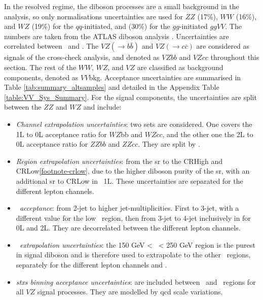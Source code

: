 In the resolved regime, the diboson processes are a small background in the analysis, so only normalisations uncertainties are used for $ZZ$ (17\%), $WW$ (16\%), and $WZ$ (19\%) for the $qq$-initiated, and (30\%) for the $gg$-initiated $ggVV$. The numbers are taken from the ATLAS diboson analysis \cite{ATL-PHYS-PUB-2023-007}. Uncertainties are correlated between \vhb\ and \vhc. The $VZ (\rightarrow b\bar{b})$ and $VZ (\rightarrow c\bar{c})$ are considered as signals of the cross-check analysis, and denoted as $VZbb$ and $VZcc$ throughout this section. The rest of the $WW$, $WZ$, and $VZ$ are classified as background components, denoted as $VV$bkg. Acceptance uncertainties are summarised in Table \ref{tab:summary_altsamples} and detailed in the Appendix Table \ref{table:VV_Sys_Summary}. For the signal components, the uncertainties are split between the $ZZ$ and $WZ$ and include:
\begin{itemize}[leftmargin=*]
    \item \textit{Channel extrapolation uncertainties}: two sets are considered. One covers the 1L to 0L acceptance ratio for $WZ$bb and $WZcc$, and the other one the 2L to 0L acceptance ratio for $ZZbb$ and $ZZcc$. They are split by \nj.
    \item \textit{Region extrapolation uncertainties}: from the \gls{sr} to the CRHigh and CRLow\cref{footnote-crlow}, due to the higher diboson purity of the \gls{sr}, with an additional \gls{sr} to CRLow in \vhb\ 1L. These uncertainties are separated for the different lepton channels.
    \item \textit{\nj\ acceptance}: from 2-jet to higher jet-multiplicities. First to 3-jet, with a different value for the low \ptv\ region, then from 3-jet to 4-jet inclusively in \ptv for 0L and 2L. They are decorrelated between the different lepton channels.
    \item \textit{\ptv\ extrapolation uncertainties}: the 150 GeV < \ptv\ < 250 GeV region is the purest in signal diboson and is therefore used to extrapolate to the other \ptv\ regions, separately for the different lepton channels and \nj.
    \item \textit{\gls{stxs} binning acceptance uncertainties}: are included between \nj\ and \ptv\ regions for all $VZ$ signal processes. They are modelled by \gls{qcd} scale variations. 
\end{itemize}

